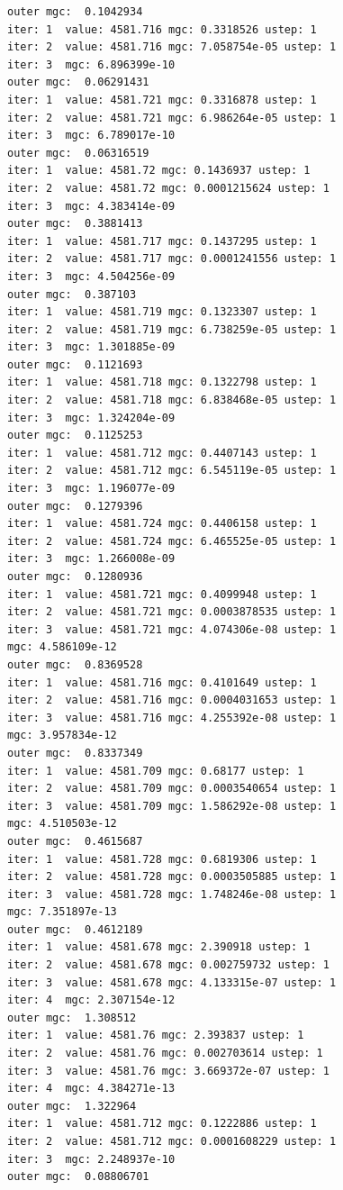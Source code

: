 \documentclass[
  letterpaper,
  DIV=11,
  numbers=noendperiod]{scrartcl}
\begin{document}
\begin{verbatim}
outer mgc:  0.1042934 
iter: 1  value: 4581.716 mgc: 0.3318526 ustep: 1 
iter: 2  value: 4581.716 mgc: 7.058754e-05 ustep: 1 
iter: 3  mgc: 6.896399e-10 
outer mgc:  0.06291431 
iter: 1  value: 4581.721 mgc: 0.3316878 ustep: 1 
iter: 2  value: 4581.721 mgc: 6.986264e-05 ustep: 1 
iter: 3  mgc: 6.789017e-10 
outer mgc:  0.06316519 
iter: 1  value: 4581.72 mgc: 0.1436937 ustep: 1 
iter: 2  value: 4581.72 mgc: 0.0001215624 ustep: 1 
iter: 3  mgc: 4.383414e-09 
outer mgc:  0.3881413 
iter: 1  value: 4581.717 mgc: 0.1437295 ustep: 1 
iter: 2  value: 4581.717 mgc: 0.0001241556 ustep: 1 
iter: 3  mgc: 4.504256e-09 
outer mgc:  0.387103 
iter: 1  value: 4581.719 mgc: 0.1323307 ustep: 1 
iter: 2  value: 4581.719 mgc: 6.738259e-05 ustep: 1 
iter: 3  mgc: 1.301885e-09 
outer mgc:  0.1121693 
iter: 1  value: 4581.718 mgc: 0.1322798 ustep: 1 
iter: 2  value: 4581.718 mgc: 6.838468e-05 ustep: 1 
iter: 3  mgc: 1.324204e-09 
outer mgc:  0.1125253 
iter: 1  value: 4581.712 mgc: 0.4407143 ustep: 1 
iter: 2  value: 4581.712 mgc: 6.545119e-05 ustep: 1 
iter: 3  mgc: 1.196077e-09 
outer mgc:  0.1279396 
iter: 1  value: 4581.724 mgc: 0.4406158 ustep: 1 
iter: 2  value: 4581.724 mgc: 6.465525e-05 ustep: 1 
iter: 3  mgc: 1.266008e-09 
outer mgc:  0.1280936 
iter: 1  value: 4581.721 mgc: 0.4099948 ustep: 1 
iter: 2  value: 4581.721 mgc: 0.0003878535 ustep: 1 
iter: 3  value: 4581.721 mgc: 4.074306e-08 ustep: 1 
mgc: 4.586109e-12 
outer mgc:  0.8369528 
iter: 1  value: 4581.716 mgc: 0.4101649 ustep: 1 
iter: 2  value: 4581.716 mgc: 0.0004031653 ustep: 1 
iter: 3  value: 4581.716 mgc: 4.255392e-08 ustep: 1 
mgc: 3.957834e-12 
outer mgc:  0.8337349 
iter: 1  value: 4581.709 mgc: 0.68177 ustep: 1 
iter: 2  value: 4581.709 mgc: 0.0003540654 ustep: 1 
iter: 3  value: 4581.709 mgc: 1.586292e-08 ustep: 1 
mgc: 4.510503e-12 
outer mgc:  0.4615687 
iter: 1  value: 4581.728 mgc: 0.6819306 ustep: 1 
iter: 2  value: 4581.728 mgc: 0.0003505885 ustep: 1 
iter: 3  value: 4581.728 mgc: 1.748246e-08 ustep: 1 
mgc: 7.351897e-13 
outer mgc:  0.4612189 
iter: 1  value: 4581.678 mgc: 2.390918 ustep: 1 
iter: 2  value: 4581.678 mgc: 0.002759732 ustep: 1 
iter: 3  value: 4581.678 mgc: 4.133315e-07 ustep: 1 
iter: 4  mgc: 2.307154e-12 
outer mgc:  1.308512 
iter: 1  value: 4581.76 mgc: 2.393837 ustep: 1 
iter: 2  value: 4581.76 mgc: 0.002703614 ustep: 1 
iter: 3  value: 4581.76 mgc: 3.669372e-07 ustep: 1 
iter: 4  mgc: 4.384271e-13 
outer mgc:  1.322964 
iter: 1  value: 4581.712 mgc: 0.1222886 ustep: 1 
iter: 2  value: 4581.712 mgc: 0.0001608229 ustep: 1 
iter: 3  mgc: 2.248937e-10 
outer mgc:  0.08806701 

\end{verbatim}
\end{document}
